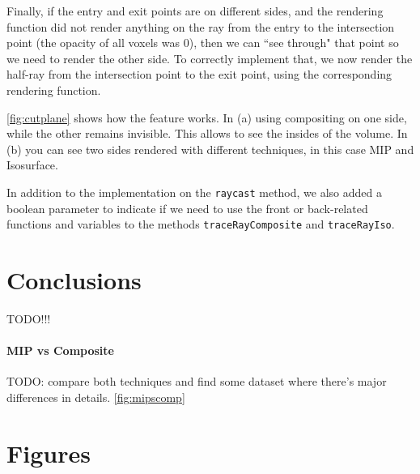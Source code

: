 \documentclass[a4paper]{article}
\begin{document}
Finally, if the entry and exit points are on different sides, and the rendering function did not render anything on the ray from the entry to the intersection point (the opacity of all voxels was $0$), then we can ``see through" that point so we need to render the other side. To correctly implement that, we now render the half-ray from the intersection point to the exit point, using the corresponding rendering function.

\autoref{fig:cutplane} shows how the feature works. In (a) using compositing on one side, while the other remains invisible. This allows to see the insides of the volume. In (b) you can see two sides rendered with different techniques, in this case MIP and Isosurface.

In addition to the implementation on the {\tt raycast} method, we also added a boolean parameter to indicate if we need to use the front or back-related functions and variables to the methods {\tt traceRayComposite} and {\tt traceRayIso}.

\section{Conclusions}

TODO!!!

\paragraph{MIP vs Composite}

TODO: compare both techniques and find some dataset where there's major differences in details. \autoref{fig:mipscomp}




\pagebreak
\appendix
\section{Figures}
\end{document}
